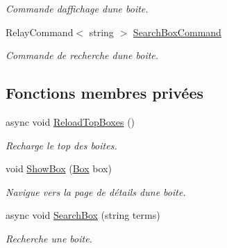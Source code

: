 \begin{DoxyCompactItemize}
\begin{DoxyCompactList}\small\item\em Commande d\textquotesingle{}affichage d\textquotesingle{}une boite. \end{DoxyCompactList}\item 
Relay\+Command$<$ string $>$ \hyperlink{class_boxes_1_1_view_models_1_1_discover_view_model_ad7bc4f429321d175c2de48df673e2a8e}{Search\+Box\+Command}
\begin{DoxyCompactList}\small\item\em Commande de recherche d\textquotesingle{}une boite. \end{DoxyCompactList}\end{DoxyCompactItemize}
\subsection*{Fonctions membres privées}
\begin{DoxyCompactItemize}
\item 
async void \hyperlink{class_boxes_1_1_view_models_1_1_discover_view_model_a1f7528d73c0ea98bec7b2370787686aa}{Reload\+Top\+Boxes} ()
\begin{DoxyCompactList}\small\item\em Recharge le top des boites. \end{DoxyCompactList}\item 
void \hyperlink{class_boxes_1_1_view_models_1_1_discover_view_model_a4d4bc38e9f10b50fe788bb419cd8c5f6}{Show\+Box} (\hyperlink{class_boxes_1_1_models_1_1_box}{Box} box)
\begin{DoxyCompactList}\small\item\em Navigue vers la page de détails d\textquotesingle{}une boite. \end{DoxyCompactList}\item 
async void \hyperlink{class_boxes_1_1_view_models_1_1_discover_view_model_a04a09e5ec95de2403c998a1cbcf161a2}{Search\+Box} (string terms)
\begin{DoxyCompactList}\small\item\em Recherche une boite. \end{DoxyCompactList}\end{DoxyCompactItemize}
